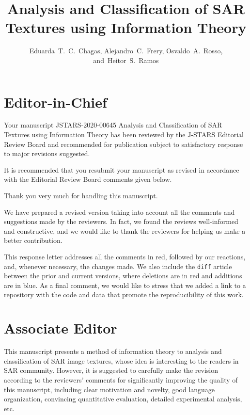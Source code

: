 \documentclass[journal,onecolumn,draftcls,11pt]{IEEEtran}
\begin{document}
\title{Analysis and Classification of SAR Textures using Information Theory}

\author{Eduarda~T.~C.~Chagas,
	Alejandro~C.~Frery,
	Osvaldo~A.~Rosso,
	and~Heitor~S.~Ramos}

\maketitle

\IEEEpeerreviewmaketitle

\section{Editor-in-Chief}
\begin{tcolorbox}[colback=red!5!white,colframe=red!75!black,title=Comment \#1]
Your manuscript JSTARS-2020-00645 Analysis and Classification of SAR Textures using Information Theory has been reviewed by the J-STARS Editorial Review Board and recommended for publication subject to satisfactory response to major revisions suggested. 

It is recommended that you resubmit your manuscript as revised in accordance with the Editorial Review Board comments given below.
\end{tcolorbox}

Thank you very much for handling this manuscript.

We have prepared a revised version taking into account all the comments and suggestions made by the reviewers.
In fact, we found the reviews well-informed and constructive, and we would like to thank the reviewers for helping us make a better contribution.

This response letter addresses all the comments in red, followed by
our reactions, and, whenever necessary, the changes made.
We also include the \texttt{diff} article between the prior and current versions, where deletions are in red and additions are in blue.
As a final comment, we would like to stress that we added a link to a repository with the code and data that promote the reproducibility of this work.

\section{Associate Editor}
\begin{tcolorbox}[colback=red!5!white,colframe=red!75!black,title=Comment \#1]
This manuscript presents a method of information theory to analysis and classification of SAR image textures, whose idea is interesting to the readers in SAR community. However, it is suggested to carefully make the revision according to the reviewers’ comments for significantly improving the quality of this manuscript, including clear motivation and novelty, good language organization, convincing quantitative evaluation, detailed experimental analysis, etc.
\end{tcolorbox}
\end{document}
